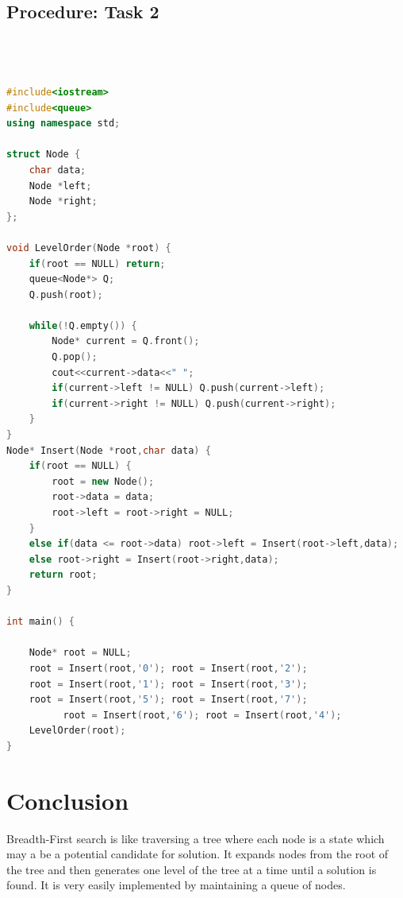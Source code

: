 \documentclass[12pt]{article}            %
\begin{document}
\subsection{Procedure: Task 2 }     

\begin{lstlisting}[language=C++]



#include<iostream>
#include<queue>
using namespace std;

struct Node {
	char data;
	Node *left;
	Node *right;
};

void LevelOrder(Node *root) {
	if(root == NULL) return;
	queue<Node*> Q;
	Q.push(root);  

	while(!Q.empty()) {
		Node* current = Q.front();
		Q.pop(); 
		cout<<current->data<<" ";
		if(current->left != NULL) Q.push(current->left);
		if(current->right != NULL) Q.push(current->right);
	}
}
Node* Insert(Node *root,char data) {
	if(root == NULL) {
		root = new Node();
		root->data = data;
		root->left = root->right = NULL;
	}
	else if(data <= root->data) root->left = Insert(root->left,data);
	else root->right = Insert(root->right,data);
	return root;
}

int main() {

	Node* root = NULL;
	root = Insert(root,'0'); root = Insert(root,'2');
	root = Insert(root,'1'); root = Insert(root,'3'); 
	root = Insert(root,'5'); root = Insert(root,'7');
          root = Insert(root,'6'); root = Insert(root,'4');
	LevelOrder(root);
}
\end{lstlisting}

\section{Conclusion}  
Breadth-First search is like traversing a tree where each node is a state which may a be a potential candidate for solution. It expands nodes from the root of the tree and then generates one level of the tree at a time until a solution is found. It is very easily implemented by maintaining a queue of nodes. 
 
\end{document}
